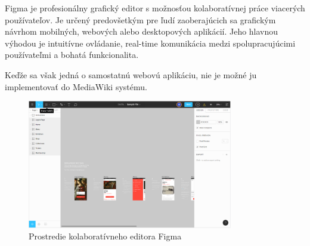 Figma je profesionálny grafický editor s možnosťou kolaboratívnej práce viacerých používateľov. Je určený predovšetkým pre ľudí zaoberajúcich sa grafickým návrhom mobilných, webových alebo desktopových aplikácií. Jeho hlavnou výhodou je intuitívne ovládanie, real-time komunikácia medzi spolupracujúcimi používateľmi a bohatá funkcionalita. 

Keďže sa však jedná o samostatnú webovú aplikáciu, nie je možné ju implementovať do MediaWiki systému.

\begin{figure}[h]
	\centerline{\includegraphics[width=0.8\textwidth]{images/figma}}
	\caption[Editor Figma]{Prostredie kolaboratívneho editora Figma}
	\label{obr:Figma}
\end{figure}
\FloatBarrier

